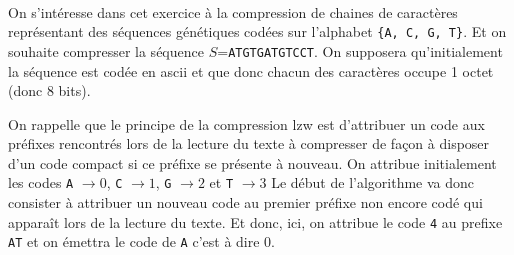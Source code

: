 \documentclass[11pt,a4paper]{article}
\begin{document}
\begin{Exercise}[title = Séquence génétique]\\
	On s'intéresse dans cet exercice à la compression de chaines de caractères représentant des séquences génétiques codées sur l'alphabet {\tt \{A, C, G, T\}}. Et on souhaite compresser la séquence $S$={\tt ATGTGATGTCCT}. On supposera qu'initialement la séquence est codée en {\sc ascii} et que donc chacun des caractères occupe 1 octet (donc 8 bits).

	\NRet \smallskip
	On rappelle que le principe de la compression {\sc lzw} est d'attribuer un code aux préfixes rencontrés lors de la lecture du texte à compresser de façon à disposer d'un code compact si ce préfixe se présente à nouveau.  On attribue initialement les codes {\tt A} $\rightarrow 0$, {\tt C} $\rightarrow 1$, {\tt G} $\rightarrow 2$  et {\tt T} $\rightarrow 3$
	Le début de l'algorithme va donc consister à attribuer un nouveau code au premier préfixe non encore codé qui apparaît lors de la lecture du texte. Et donc, ici, on attribue le code {\tt 4} au prefixe {\tt AT} et on émettra le code de {\tt A} c'est à dire 0.


\end{Exercise}
\end{document}
